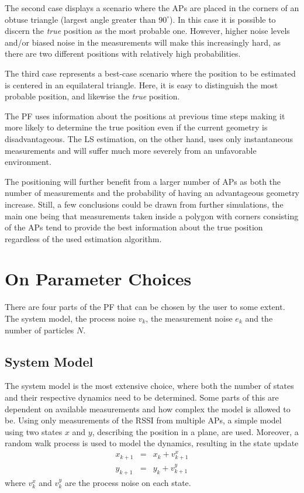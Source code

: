 \documentclass{LTHthesis}
\begin{document}
The second case displays a scenario where the APs are placed in the corners of an obtuse triangle (largest angle greater than $90^\circ$). In this  case it is possible to discern the \emph{true} position as the most probable one. However, higher noise levels and/or biased noise in the measurements will make this increasingly hard, as there are two different positions with relatively high probabilities.

The third case represents a best-case scenario where the position to be estimated is centered in an equilateral triangle. Here, it is easy to distinguish the most probable position, and likewise the \emph{true} position.

The PF uses information about the positions at previous time steps making it more likely to determine the true position even if the current geometry is disadvantageous. The LS estimation, on the other hand, uses only instantaneous measurements and will suffer much more severely from an unfavorable environment. 
 
The positioning will further benefit from a larger number of APs as both the number of measurements and the probability of having an advantageous geometry increase. Still, a few conclusions could be drawn from further simulations, the main one being that measurements taken inside a polygon with corners consisting of the APs tend to provide the best information about the true position regardless of the used estimation algorithm. 
%
\section{On Parameter Choices}
%
There are four parts of the PF that can be chosen by the user to some extent. The system model, the process noise $v_k$,  the measurement noise $e_k$  and the number of particles $N$.
%
\subsection{System Model}
%
The system model is the most extensive choice, where both the number of states and their respective dynamics need to be determined. Some parts of this are dependent on available measurements and how complex the model is allowed to be. Using only measurements of the RSSI from multiple APs, a simple model using two states $x$ and $y$, describing the position in a plane, are used. Moreover, a random walk process is used to model the dynamics, resulting in the state update
%
\begin{eqnarray}
x_{k+1}&=&x_k + v^x_{k+1} \\
y_{k+1}&=&y_k + v^y_{k+1} 
\end{eqnarray}
%
where $v^x_k$ and $v^y_k$ are the process noise on each state. 
%
\end{document}
